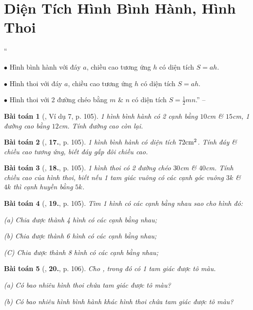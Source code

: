 \documentclass{article}
\numberwithin{equation}{section}
\newtheorem{baitoan}{Bài toán}[section]
\begin{document}

\section{Diện Tích Hình Bình Hành, Hình Thoi}
``\begin{enumerate*}
	\item[$\bullet$] Hình bình hành với đáy $a$, chiều cao tương ứng $h$ có diện tích $S = ah$.
	\item[$\bullet$] Hình thoi với đáy $a$, chiều cao tương ứng $h$ có diện tích $S = ah$.
	\item[$\bullet$] Hình thoi với 2 đường chéo bằng $m$ \& $n$ có diện tích $S = \frac{1}{2}mn$.'' -- \cite[p. 105]{Binh_Toan_6_tap_1}
\end{enumerate*}

\begin{baitoan}[\cite{Binh_Toan_6_tap_1}, Ví dụ 7, p. 105]
	1 hình bình hành có 2 cạnh bằng $10$\emph{cm} \& $15$\emph{cm}, 1 đường cao bằng $12$\emph{cm}. Tính đường cao còn lại.
\end{baitoan}

\begin{baitoan}[\cite{Binh_Toan_6_tap_1}, \textbf{17.}, p. 105]
	1 hình bình hành có diện tích $\rm72cm^2$. Tính đáy \& chiều cao tương ứng, biết đáy gấp đôi chiều cao.
\end{baitoan}

\begin{baitoan}[\cite{Binh_Toan_6_tap_1}, \textbf{18.}, p. 105]
	1 hình thoi có 2 đường chéo $30$\emph{cm} \& $40$\emph{cm}. Tính chiều cao của hình thoi, biết nếu 1 tam giác vuông có các cạnh góc vuông $3k$ \& $4k$ thì cạnh huyền bằng $5k$.
\end{baitoan}

\begin{baitoan}[\cite{Binh_Toan_6_tap_1}, \textbf{19.}, p. 105]
	Tìm 1 hình có các cạnh bằng nhau sao cho hình đó:
	\begin{enumerate*}
		\item[(a)] Chia được thành 4 hình có các cạnh bằng nhau;
		\item[(b)] Chia được thành 6 hình có các cạnh bằng nhau;
		\item[(C)] Chia được thành 8 hình có các cạnh bằng nhau;
	\end{enumerate*}
\end{baitoan}

\begin{baitoan}[\cite{Binh_Toan_6_tap_1}, \textbf{20.}, p. 106]
	Cho \cite[Hình 35, p. 105]{Binh_Toan_6_tap_1}, trong đó có 1 tam giác được tô màu.
	\begin{enumerate*}
		\item[(a)] Có bao nhiêu hình thoi chứa tam giác được tô màu?
		\item[(b)] Có bao nhiêu hình bình hành khác hình thoi chứa tam giác được tô màu?
	\end{enumerate*}
\end{baitoan}
\end{document}
